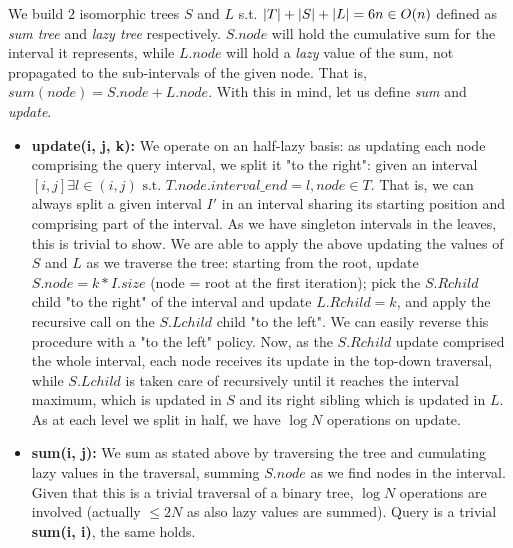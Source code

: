 We build $2$ isomorphic trees $S$ and $L$ s.t. $\lvert T\rvert + \lvert S\rvert + \lvert L\rvert = 6n \in O(n)$ defined as \emph{sum tree} and \emph{lazy tree} respectively.
$S.node$ will hold the cumulative sum for the interval it represents, while $L.node$ will hold a \emph{lazy} value of the sum, not propagated to the sub-intervals of the given node.
That is, $sum(node) = S.node + L.node$.
With this in mind, let us define \emph{sum} and \emph{update}.
\begin{itemize}
\item \textbf{update(i, j, k):} We operate on an half-lazy basis: as updating each node comprising the query interval, we split it "to the right": given an interval $[i, j] \exists l \in (i, j) \text{ s.t. } T.node.interval\_end = l, node \in T$.
That is, we can always split a given interval $I'$ in an interval sharing its starting position and comprising part of the interval.
As we have singleton intervals in the leaves, this is trivial to show.
We are able to apply the above updating the values of $S$ and $L$ as we traverse the tree: starting from the root, update $S.node = k * I.size$ (node = root at the first iteration); pick the $S.Rchild$ child "to the right" of the interval and update $L.Rchild = k$, and apply the recursive call on the $S.Lchild$ child "to the left".
We can easily reverse this procedure with a "to the left" policy.
Now, as the $S.Rchild$ update comprised the whole interval, each node receives its update in the top-down traversal, while $S.Lchild$ is taken care of recursively until it reaches the interval maximum, which is updated in $S$ and its right sibling which is updated in $L$.
As at each level we split in half, we have $\log N$ operations on update.
\item \textbf{sum(i, j):} We sum as stated above by traversing the tree and cumulating lazy values in the traversal, summing $S.node$ as we find nodes in the interval.
Given that this is a trivial traversal of a binary tree, $\log N$ operations are involved (actually $\leq 2N$ as also lazy values are summed).
Query is a trivial \textbf{sum(i, i)}, the same holds.
\end{itemize}

